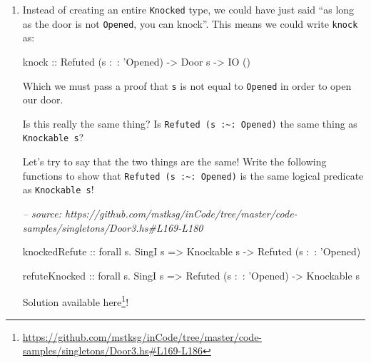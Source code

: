 \documentclass[]{article}
\newenvironment{Shaded}{}{}
\newcommand{\CommentTok}[1]{\textcolor[rgb]{0.38,0.63,0.69}{\textit{#1}}}
\newcommand{\DataTypeTok}[1]{\textcolor[rgb]{0.56,0.13,0.00}{#1}}
\newcommand{\FunctionTok}[1]{\textcolor[rgb]{0.02,0.16,0.49}{#1}}
\newcommand{\NormalTok}[1]{#1}
\newcommand{\OtherTok}[1]{\textcolor[rgb]{0.00,0.44,0.13}{#1}}
\renewcommand{\href}[2]{#2\footnote{\url{#1}}}
\begin{document}
\begin{enumerate}
  Solutions available
  \href{https://github.com/mstksg/inCode/tree/master/code-samples/singletons/Door3.hs\#L122-L166}{here}!
\item
  Instead of creating an entire \texttt{Knocked} type, we could have just said
  ``as long as the door is not \texttt{\textquotesingle{}Opened}, you can
  knock''. This means we could write \texttt{knock} as:

\begin{Shaded}
\begin{Highlighting}[]
\OtherTok{knock ::} \DataTypeTok{Refuted}\NormalTok{ (s }\FunctionTok{:~:}\NormalTok{ '}\DataTypeTok{Opened}\NormalTok{) }\OtherTok{->} \DataTypeTok{Door}\NormalTok{ s }\OtherTok{->} \DataTypeTok{IO}\NormalTok{ ()}
\end{Highlighting}
\end{Shaded}

  Which we must pass a proof that \texttt{s} is not equal to
  \texttt{\textquotesingle{}Opened} in order to open our door.

  Is this really the same thing? Is
  \texttt{Refuted\ (s\ :\textasciitilde{}:\ \textquotesingle{}Opened)} the same
  thing as \texttt{Knockable\ s}?

  Let's try to say that the two things are the same! Write the following
  functions to show that
  \texttt{Refuted\ (s\ :\textasciitilde{}:\ \textquotesingle{}Opened)} is the
  same logical predicate as \texttt{Knockable\ s}!

\begin{Shaded}
\begin{Highlighting}[]
\CommentTok{-- source: https://github.com/mstksg/inCode/tree/master/code-samples/singletons/Door3.hs#L169-L180}

\NormalTok{knockedRefute}
\OtherTok{    ::}\NormalTok{ forall s}\FunctionTok{.} \DataTypeTok{SingI}\NormalTok{ s}
    \OtherTok{=>} \DataTypeTok{Knockable}\NormalTok{ s}
    \OtherTok{->} \DataTypeTok{Refuted}\NormalTok{ (s }\FunctionTok{:~:}\NormalTok{ '}\DataTypeTok{Opened}\NormalTok{)}

\NormalTok{refuteKnocked}
\OtherTok{    ::}\NormalTok{ forall s}\FunctionTok{.} \DataTypeTok{SingI}\NormalTok{ s}
    \OtherTok{=>} \DataTypeTok{Refuted}\NormalTok{ (s }\FunctionTok{:~:}\NormalTok{ '}\DataTypeTok{Opened}\NormalTok{)}
    \OtherTok{->} \DataTypeTok{Knockable}\NormalTok{ s}
\end{Highlighting}
\end{Shaded}

  Solution available
  \href{https://github.com/mstksg/inCode/tree/master/code-samples/singletons/Door3.hs\#L169-L186}{here}!


\end{enumerate}
\end{document}
